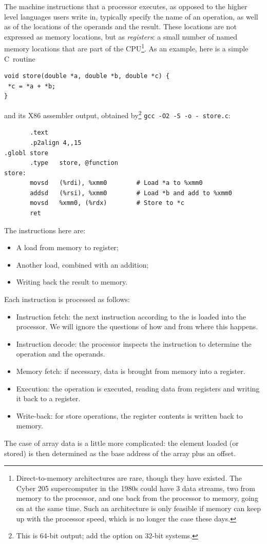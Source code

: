 The machine instructions that a processor executes, as opposed to the
higher level languages users write in, typically specify the name of
an operation, as well as of the locations of the operands and the
result. These locations are not expressed as memory locations, but as
\emph{registers}: a small number of named memory locations that
are part of the CPU\footnote {Direct-to-memory architectures are rare,
  though they have existed. The Cyber 205 supercomputer in the 1980s
  could have 3 data streams, two from memory to the processor, and one
  back from the processor to memory, going on at the same time. Such
  an architecture is only feasible if memory can keep up with the
  processor speed, which is no longer the case these days.}.  As an
example, here is a simple C~routine
\begin{verbatim}
void store(double *a, double *b, double *c) {
 *c = *a + *b;
}
\end{verbatim}
and its X86 assembler output, obtained by\footnote{This is 64-bit
  output; add the option  on 32-bit systems.}
\verb+gcc -O2 -S -o - store.c+:
\begin{verbatim}
       .text
       .p2align 4,,15
.globl store
       .type   store, @function
store:
       movsd   (%rdi), %xmm0		# Load *a to %xmm0
       addsd   (%rsi), %xmm0		# Load *b and add to %xmm0
       movsd   %xmm0, (%rdx)		# Store to *c
       ret
\end{verbatim}
The instructions here are:
\begin{itemize}
\item A load from memory to register;
\item Another load, combined with an addition;
\item Writing back the result to memory.
\end{itemize}
Each instruction is processed as follows:
\begin{itemize}
\item Instruction fetch: the next instruction according to the
   is loaded into the processor. We will
  ignore the questions of how and from where this happens.
\item Instruction decode: the processor inspects the instruction to
  determine the operation and the operands.
\item Memory fetch: if necessary, data is brought from memory
    into a register.
\item Execution: the operation is executed, reading data from registers
  and writing it back to a register.
\item Write-back: for store operations, the register contents is
  written back to memory.
\end{itemize}
The case of array data is a little more complicated: the element
loaded (or stored) is then determined as the base address of the array
plus an offset.

